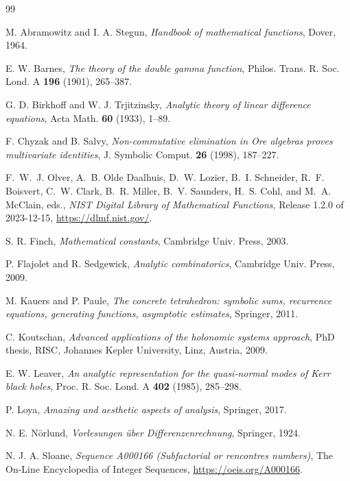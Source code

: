 \documentclass[11pt,reqno]{amsart}
\theoremstyle{definition}
\numberwithin{equation}{section}
\begin{document}
\begin{thebibliography}{99}

M. Abramowitz and I. A. Stegun, \emph{Handbook of mathematical functions}, Dover, 1964.

E. W. Barnes, \emph{The theory of the double gamma function}, Philos. Trans. R. Soc. Lond. A \textbf{196} (1901), 265--387.

G. D. Birkhoff and W. J. Trjitzinsky, \emph{Analytic theory of linear difference equations}, Acta Math. \textbf{60} (1933), 1--89.

F. Chyzak and B. Salvy, \emph{Non-commutative elimination in Ore algebras proves multivariate identities}, J. Symbolic Comput. \textbf{26} (1998), 187--227.

F.~W.~J. Olver, A.~B. Olde Daalhuis, D.~W. Lozier, B.~I. Schneider, R.~F. Boisvert, C.~W. Clark, B.~R. Miller, B.~V. Saunders, H.~S. Cohl, and M.~A. McClain, eds., \emph{NIST Digital Library of Mathematical Functions}, Release 1.2.0 of 2023-12-15, \url{https://dlmf.nist.gov/}.

S. R. Finch, \emph{Mathematical constants}, Cambridge Univ. Press, 2003.

P. Flajolet and R. Sedgewick, \emph{Analytic combinatorics}, Cambridge Univ. Press, 2009.

M. Kauers and P. Paule, \emph{The concrete tetrahedron: symbolic sums, recurrence equations, generating functions, asymptotic estimates}, Springer, 2011.

C. Koutschan, \emph{Advanced applications of the holonomic systems approach}, PhD thesis, RISC, Johannes Kepler University, Linz, Austria, 2009.

E. W. Leaver, \emph{An analytic representation for the quasi-normal modes of Kerr black holes}, Proc. R. Soc. Lond. A \textbf{402} (1985), 285--298.

P. Loya, \emph{Amazing and aesthetic aspects of analysis}, Springer, 2017.

N. E. Nörlund, \emph{Vorlesungen über Differenzenrechnung}, Springer, 1924.

N. J. A. Sloane, \emph{Sequence A000166 (Subfactorial or rencontres numbers)}, The On-Line Encyclopedia of Integer Sequences, \url{https://oeis.org/A000166}.


\end{thebibliography}
\end{document}
